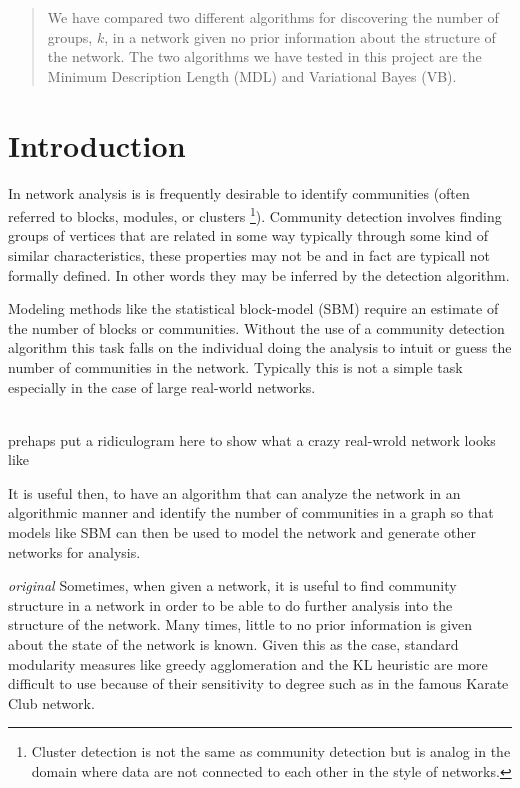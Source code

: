 \documentclass[twocolumn,twoside]{IEEEtran}
\author{Brett Israelsen & Joshua Rahm}
\begin{document}
\maketitle

\begin{abstract}
We have compared two different algorithms for discovering
the number of groups, $k$, in a network given no prior information about the
structure of the network. The two algorithms we have tested in this project are
the Minimum Description Length (MDL) and Variational Bayes (VB).
\end{abstract}

\section*{Introduction}\label{sec:Intro}
In network analysis is is frequently desirable to identify communities (often referred to blocks, modules, or clusters \footnote{Cluster detection is not the same as community detection but is analog in the domain where data are not connected to each other in the style of networks.}). Community detection involves finding groups of vertices that are related in some way typically through some kind of similar characteristics, these properties may not be and in fact are typicall not formally defined. In
other words they may be inferred by the detection algorithm.

Modeling methods like the statistical block-model (SBM) require an estimate of the number of blocks or communities. Without the use of a community detection algorithm this task falls on the individual doing the analysis to intuit or guess the number of communities in the network. Typically this is not a simple task especially in the case of large real-world networks.

\\prehaps put a ridiculogram here to show what a crazy real-wrold network looks like

It is useful then, to have an algorithm that can analyze the network in an algorithmic manner and identify the number of communities in a graph so that models like SBM can then be used to model the network and generate other networks for analysis.

\emph{original}
Sometimes, when given a network, it is useful to find community structure in a
network in order to be able to do further analysis into the structure of the
network. Many times, little to no prior information is given about the state of
the network is known. Given this as the case, standard modularity measures like
greedy agglomeration and the KL heuristic are more difficult to use because of their
sensitivity to degree such as in the famous Karate Club network.
\end{document}
